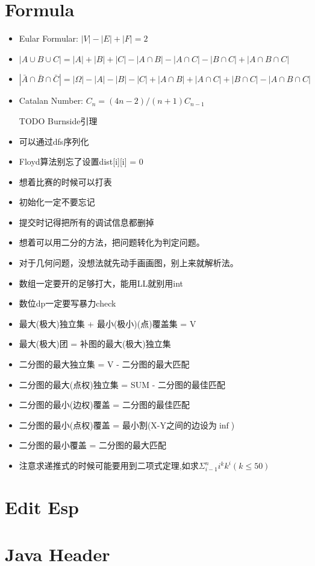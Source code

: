 \documentclass[
	10pt,
	twocolumn,
	a4paper,
]{article}
\begin{document}
\section{Formula}
\begin{itemize} 
\setlength{\itemsep}{0pt}
\item Eular Formular: $|V| - |E| + |F| = 2$
\item $|A \cup B \cup C | = |A| + |B| + |C| - |A \cap B| - |A \cap C| - |B \cap C| + |A \cap B \cap C|$
\item $|\bar A \cap \bar B \cap \bar C | = |\Omega| - |A| - |B| - |C| + |A \cap B| + |A \cap C| + |B \cap C| - |A \cap B \cap C| $
\item Catalan Number: $C_n = (4n-2) / (n+1) C_{n-1}$
\item [TODO]Burnside引理
\item 可以通过dfs序列化
\item Floyd算法别忘了设置dist[i][i] = 0
\item 想着比赛的时候可以打表
\item 初始化一定不要忘记
\item 提交时记得把所有的调试信息都删掉
\item 想着可以用二分的方法，把问题转化为判定问题。
\item 对于几何问题，没想法就先动手画画图，别上来就解析法。
\item 数组一定要开的足够打大，能用LL就别用int
\item 数位dp一定要写暴力check
\item 最大(极大)独立集 + 最小(极小)(点)覆盖集 = V
\item 最大(极大)团 = 补图的最大(极大)独立集
\item 二分图的最大独立集 = V - 二分图的最大匹配
\item 二分图的最大(点权)独立集 = SUM - 二分图的最佳匹配
\item 二分图的最小(边权)覆盖 = 二分图的最佳匹配
\item 二分图的最小(点权)覆盖 = 最小割(X-Y之间的边设为$\inf$)
\item 二分图的最小覆盖 = 二分图的最大匹配
\item 注意求递推式的时候可能要用到二项式定理,如求$ \Sigma_{i-1}^n{i^k k^i} (k \le 50) $
\end{itemize} 

\section{Edit Esp}

\section{Java Header}

\end{document}
